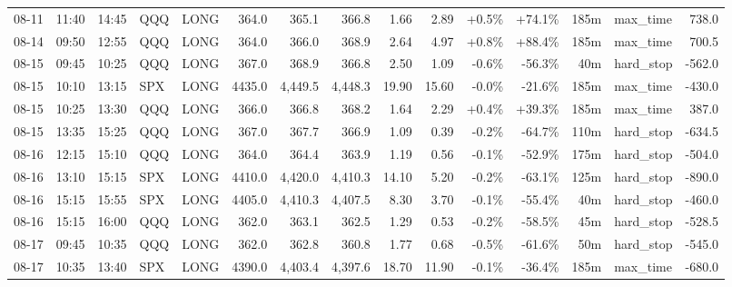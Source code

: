 \documentclass[11pt,a4paper,twoside]{article}
\begin{document}
\begin{landscape}
\begin{center}
\begin{longtable}{>{\color{txtmain}}l l l l l r r r r r r r r >{\color{txtmain}}l r}
08-11 & 11:40 & 14:45 & QQQ & LONG & 364.0 & 365.1 & 366.8 & 1.66 & 2.89 & \textcolor{wingreen}{+0.5\%} & \textcolor{wingreen}{+74.1\%} & 185m & max\_time & \textcolor{wingreen}{738.0} \\
08-14 & 09:50 & 12:55 & QQQ & LONG & 364.0 & 366.0 & 368.9 & 2.64 & 4.97 & \textcolor{wingreen}{+0.8\%} & \textcolor{wingreen}{+88.4\%} & 185m & max\_time & \textcolor{wingreen}{700.5} \\
08-15 & 09:45 & 10:25 & QQQ & LONG & 367.0 & 368.9 & 366.8 & 2.50 & 1.09 & \textcolor{lossred}{-0.6\%} & \textcolor{lossred}{-56.3\%} & 40m & hard\_stop & \textcolor{lossred}{-562.0} \\
08-15 & 10:10 & 13:15 & SPX & LONG & 4435.0 & 4,449.5 & 4,448.3 & 19.90 & 15.60 & \textcolor{lossred}{-0.0\%} & \textcolor{lossred}{-21.6\%} & 185m & max\_time & \textcolor{lossred}{-430.0} \\
08-15 & 10:25 & 13:30 & QQQ & LONG & 366.0 & 366.8 & 368.2 & 1.64 & 2.29 & \textcolor{wingreen}{+0.4\%} & \textcolor{wingreen}{+39.3\%} & 185m & max\_time & \textcolor{wingreen}{387.0} \\
08-15 & 13:35 & 15:25 & QQQ & LONG & 367.0 & 367.7 & 366.9 & 1.09 & 0.39 & \textcolor{lossred}{-0.2\%} & \textcolor{lossred}{-64.7\%} & 110m & hard\_stop & \textcolor{lossred}{-634.5} \\
08-16 & 12:15 & 15:10 & QQQ & LONG & 364.0 & 364.4 & 363.9 & 1.19 & 0.56 & \textcolor{lossred}{-0.1\%} & \textcolor{lossred}{-52.9\%} & 175m & hard\_stop & \textcolor{lossred}{-504.0} \\
08-16 & 13:10 & 15:15 & SPX & LONG & 4410.0 & 4,420.0 & 4,410.3 & 14.10 & 5.20 & \textcolor{lossred}{-0.2\%} & \textcolor{lossred}{-63.1\%} & 125m & hard\_stop & \textcolor{lossred}{-890.0} \\
08-16 & 15:15 & 15:55 & SPX & LONG & 4405.0 & 4,410.3 & 4,407.5 & 8.30 & 3.70 & \textcolor{lossred}{-0.1\%} & \textcolor{lossred}{-55.4\%} & 40m & hard\_stop & \textcolor{lossred}{-460.0} \\
08-16 & 15:15 & 16:00 & QQQ & LONG & 362.0 & 363.1 & 362.5 & 1.29 & 0.53 & \textcolor{lossred}{-0.2\%} & \textcolor{lossred}{-58.5\%} & 45m & hard\_stop & \textcolor{lossred}{-528.5} \\
08-17 & 09:45 & 10:35 & QQQ & LONG & 362.0 & 362.8 & 360.8 & 1.77 & 0.68 & \textcolor{lossred}{-0.5\%} & \textcolor{lossred}{-61.6\%} & 50m & hard\_stop & \textcolor{lossred}{-545.0} \\
08-17 & 10:35 & 13:40 & SPX & LONG & 4390.0 & 4,403.4 & 4,397.6 & 18.70 & 11.90 & \textcolor{lossred}{-0.1\%} & \textcolor{lossred}{-36.4\%} & 185m & max\_time & \textcolor{lossred}{-680.0} \\

\end{longtable}
\end{center}
\end{landscape}
\end{document}

